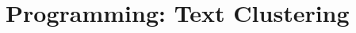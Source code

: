 \documentclass[twoside,10pt]{article}
\begin{document}
\vspace{1cm}
%
%
%
%





\section{Programming: Text Clustering}
\end{document}
